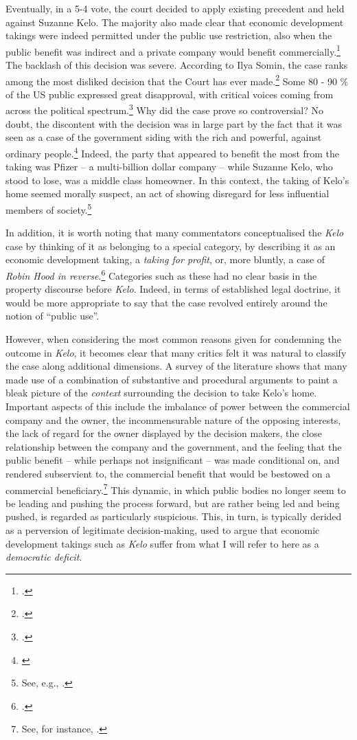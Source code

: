Eventually, in a 5-4 vote, the court decided to apply existing precedent and held against Suzanne Kelo. The majority also made clear that economic development takings were indeed permitted under the public use restriction, also when the public benefit was indirect and a private company would benefit commercially.\footcite[469-470]{kelo05} The backlash of this decision was severe. According to Ilya Somin, the case ranks among the most disliked decision that the Court has ever made.\footcite[2]{somin11} Some 80 - 90 \% of the US public expressed great disapproval, with critical voices coming from across the political spectrum.\footcite[2108-2110]{somin09} Why did the case prove so controversial? No doubt, the discontent with the decision was  in large part by the fact that it was seen as a case of the government siding with the rich and powerful, against ordinary people.\footnote{\cite[630-634]{baron07}} Indeed, the party that appeared to benefit the most from the taking was Pfizer -- a multi-billion dollar company -- while Suzanne Kelo, who stood to lose, was a middle class homeowner. In this context, the taking of Kelo's home seemed morally suspect, an act of  showing disregard for less influential members of society.\footnote{See, e.g., \cite{underkuffler06}.}

In addition, it is worth noting that many commentators conceptualised the {\it Kelo} case by thinking of it as belonging to a special category, by describing it as an economic development taking, a {\it taking for profit}, or, more bluntly, a case of {\it Robin Hood in reverse}.\footcite{somin05} Categories such as these had no clear basis in the property discourse before {\it Kelo}. Indeed, in terms of established legal doctrine, it would be more appropriate to say that the case revolved entirely around the notion of ``public use''. 

However, when considering the most common reasons given for condemning the outcome in {\it Kelo}, it becomes clear that many critics felt it was natural to classify the case along additional dimensions. A survey of the literature shows that many made use of a combination of substantive and procedural arguments to paint a bleak picture of the {\it context} surrounding the decision to take Kelo's home. Important aspects of this include the imbalance of power between the commercial company and the owner, the incommensurable nature of the opposing interests, the lack of regard for the owner displayed by the decision makers, the close relationship between the company and the government, and the feeling that the public benefit -- while perhaps not insignificant -- was made conditional on, and rendered subservient to, the commercial benefit that would be bestowed on a commercial beneficiary.\footnote{See, for instance, \cite{underkuffler06,somin07,sandefur06,cohen06,hafetz09,hudson10}.}  This dynamic, in which public bodies no longer seem to be leading and pushing the process forward, but are rather being led and being pushed, is regarded as particularly suspicious. This, in turn, is typically derided as a perversion of legitimate decision-making, used to argue that economic development takings such as {\it Kelo} suffer from what I will refer to here as a {\it democratic deficit}.

